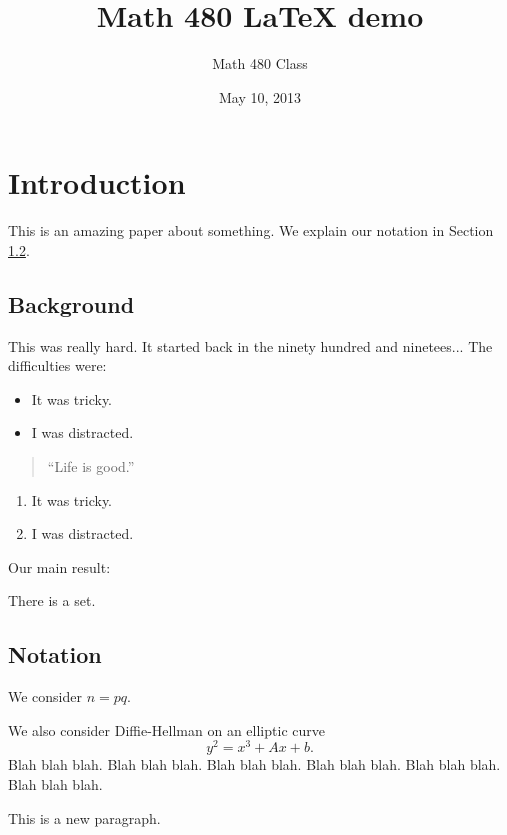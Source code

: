 \documentclass{article}
\title{Math 480 LaTeX demo}
\author{Math 480 Class}
\date{May 10, 2013}
\begin{document}
\maketitle  %

\section{Introduction}

This is an amazing paper about something.  We explain our notation in Section \ref{notation}.

\subsection{Background}
This was really hard.  It started back in the ninety hundred and ninetees...  The difficulties were:

\begin{itemize}   %
   \item It was tricky.

   \item I was distracted.
\end{itemize}

\begin{quote}
``Life is good.''
\end{quote}



\begin{enumerate}   %
   \item It was tricky.

   \item I was distracted.
\end{enumerate}

Our main result:

\begin{theorem}[Me]
There is a set.
\end{theorem}

\subsection{Notation}\label{notation}

We consider $n=pq$.

We also consider Diffie-Hellman on an elliptic curve
$$
   y^2 = x^3 + Ax + b.
$$
Blah blah blah. Blah blah blah.
Blah blah blah.
Blah blah blah.
Blah blah blah.
Blah blah blah.


\vspace{1em}


This is a new paragraph.

\end{document}
